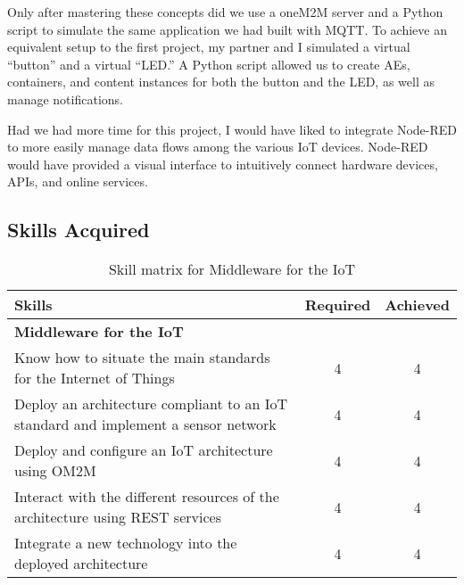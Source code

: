 \noindent Only after mastering these concepts did we use a oneM2M server and a Python script to simulate the same application we had built with MQTT. To achieve an equivalent setup to the first project, my partner and I simulated a virtual “button” and a virtual “LED.” A Python script allowed us to create AEs, containers, and content instances for both the button and the LED, as well as manage notifications. 
\vspace{0.25cm}

\noindent Had we had more time for this project, I would have liked to integrate Node-RED to more easily manage data flows among the various IoT devices. Node-RED would have provided a visual interface to intuitively connect hardware devices, APIs, and online services.

\subsection{Skills Acquired}

\begin{table}[h!]
    \centering
    \renewcommand{\arraystretch}{1.5} %
    \begin{tabular}{|p{11cm}|c|c|}
    \hline
    \rowcolor[gray]{0.8}
    \textbf{Skills} & \textbf{Required} & \textbf{Achieved} \\ \hline
    \rowcolor[gray]{0.9} \textbf{Middleware for the IoT} &  &  \\ \hline
    Know how to situate the main standards for the Internet of Things & 4 & 4 \\ \hline
    Deploy an architecture compliant to an IoT standard and implement a sensor network & 4 & 4 \\ \hline
    Deploy and configure an IoT architecture using OM2M & 4 & 4 \\ \hline
    Interact with the different resources of the architecture using REST services & 4 & 4 \\ \hline
    Integrate a new technology into the deployed architecture & 4 & 4 \\ \hline
    \end{tabular}
    \caption{Skill matrix for Middleware for the IoT}
    \label{table:skills-middleware-iot}
\end{table}

